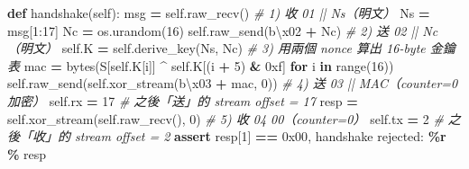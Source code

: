 \documentclass[10pt,a4paper]{article}
\newenvironment{Shaded}{\begin{snugshade}}{\end{snugshade}}
\newcommand{\BaseNTok}[1]{\textcolor[rgb]{0.00,0.00,0.81}{#1}}
\newcommand{\BuiltInTok}[1]{#1}
\newcommand{\CharTok}[1]{\textcolor[rgb]{0.31,0.60,0.02}{#1}}
\newcommand{\CommentTok}[1]{\textcolor[rgb]{0.56,0.35,0.01}{\textit{#1}}}
\newcommand{\ControlFlowTok}[1]{\textcolor[rgb]{0.13,0.29,0.53}{\textbf{#1}}}
\newcommand{\DecValTok}[1]{\textcolor[rgb]{0.00,0.00,0.81}{#1}}
\newcommand{\KeywordTok}[1]{\textcolor[rgb]{0.13,0.29,0.53}{\textbf{#1}}}
\newcommand{\NormalTok}[1]{#1}
\newcommand{\OperatorTok}[1]{\textcolor[rgb]{0.81,0.36,0.00}{\textbf{#1}}}
\newcommand{\SpecialCharTok}[1]{\textcolor[rgb]{0.81,0.36,0.00}{\textbf{#1}}}
\newcommand{\StringTok}[1]{\textcolor[rgb]{0.31,0.60,0.02}{#1}}
\newcommand{\VariableTok}[1]{\textcolor[rgb]{0.00,0.00,0.00}{#1}}
\renewenvironment{Shaded}{%
  \def\FrameCommand{\fboxsep=3.2pt\colorbox{shadecolor}}%
  \MakeFramed{\advance\hsize-\width\FrameRestore\small}%
}{%
  \endMakeFramed
}
\begin{document}
\begin{Shaded}
\begin{Highlighting}[]
    \KeywordTok{def}\NormalTok{ handshake(}\VariableTok{self}\NormalTok{):}
\NormalTok{        msg }\OperatorTok{=} \VariableTok{self}\NormalTok{.raw\_recv()               }\CommentTok{\# 1) 收 01 || Ns（明文）}
\NormalTok{        Ns }\OperatorTok{=}\NormalTok{ msg[}\DecValTok{1}\NormalTok{:}\DecValTok{17}\NormalTok{]}
\NormalTok{        Nc }\OperatorTok{=}\NormalTok{ os.urandom(}\DecValTok{16}\NormalTok{)}
        \VariableTok{self}\NormalTok{.raw\_send(}\StringTok{b\textquotesingle{}}\CharTok{\textbackslash{}x02}\StringTok{\textquotesingle{}} \OperatorTok{+}\NormalTok{ Nc)         }\CommentTok{\# 2) 送 02 || Nc（明文）}
        \VariableTok{self}\NormalTok{.K }\OperatorTok{=} \VariableTok{self}\NormalTok{.derive\_key(Ns, Nc)    }\CommentTok{\# 3) 用兩個 nonce 算出 16{-}byte 金鑰表}
\NormalTok{        mac }\OperatorTok{=} \BuiltInTok{bytes}\NormalTok{(S[}\VariableTok{self}\NormalTok{.K[i]] }\OperatorTok{\^{}} \VariableTok{self}\NormalTok{.K[(i }\OperatorTok{+} \DecValTok{5}\NormalTok{) }\OperatorTok{\&} \BaseNTok{0xf}\NormalTok{] }\ControlFlowTok{for}\NormalTok{ i }\KeywordTok{in} \BuiltInTok{range}\NormalTok{(}\DecValTok{16}\NormalTok{))}
        \VariableTok{self}\NormalTok{.raw\_send(}\VariableTok{self}\NormalTok{.xor\_stream(}\StringTok{b\textquotesingle{}}\CharTok{\textbackslash{}x03}\StringTok{\textquotesingle{}} \OperatorTok{+}\NormalTok{ mac, }\DecValTok{0}\NormalTok{))   }\CommentTok{\# 4) 送 03 || MAC（counter=0 加密）}
        \VariableTok{self}\NormalTok{.rx }\OperatorTok{=} \DecValTok{17}                        \CommentTok{\# 之後「送」的 stream offset = 17}
\NormalTok{        resp }\OperatorTok{=} \VariableTok{self}\NormalTok{.xor\_stream(}\VariableTok{self}\NormalTok{.raw\_recv(), }\DecValTok{0}\NormalTok{)         }\CommentTok{\# 5) 收 04 00（counter=0）}
        \VariableTok{self}\NormalTok{.tx }\OperatorTok{=} \DecValTok{2}                         \CommentTok{\# 之後「收」的 stream offset = 2}
        \ControlFlowTok{assert}\NormalTok{ resp[}\DecValTok{1}\NormalTok{] }\OperatorTok{==} \BaseNTok{0x00}\NormalTok{, }\StringTok{\textquotesingle{}handshake rejected: }\SpecialCharTok{\%r}\StringTok{\textquotesingle{}} \OperatorTok{\%}\NormalTok{ resp}
\end{Highlighting}
\end{Shaded}
\end{document}
